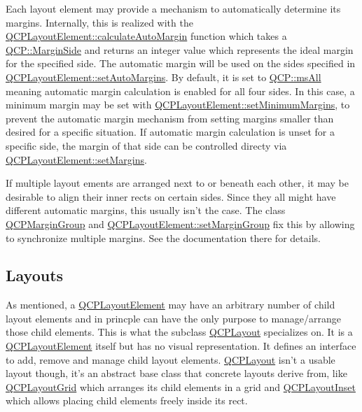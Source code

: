 Each layout element may provide a mechanism to automatically determine its margins. Internally, this is realized with the \hyperlink{class_q_c_p_layout_element_a005c9f0fe84bc1591a2cf2c46fd477b4}{Q\-C\-P\-Layout\-Element\-::calculate\-Auto\-Margin} function which takes a \hyperlink{namespace_q_c_p_a7e487e3e2ccb62ab7771065bab7cae54}{Q\-C\-P\-::\-Margin\-Side} and returns an integer value which represents the ideal margin for the specified side. The automatic margin will be used on the sides specified in \hyperlink{class_q_c_p_layout_element_accfda49994e3e6d51ed14504abf9d27d}{Q\-C\-P\-Layout\-Element\-::set\-Auto\-Margins}. By default, it is set to \hyperlink{namespace_q_c_p_a7e487e3e2ccb62ab7771065bab7cae54a43d7361cb0c5244eabdc962021bffebc}{Q\-C\-P\-::ms\-All} meaning automatic margin calculation is enabled for all four sides. In this case, a minimum margin may be set with \hyperlink{class_q_c_p_layout_element_a0a8a17abc16b7923159fcc7608f94673}{Q\-C\-P\-Layout\-Element\-::set\-Minimum\-Margins}, to prevent the automatic margin mechanism from setting margins smaller than desired for a specific situation. If automatic margin calculation is unset for a specific side, the margin of that side can be controlled directy via \hyperlink{class_q_c_p_layout_element_a8f450b1f3f992ad576fce2c63d8b79cf}{Q\-C\-P\-Layout\-Element\-::set\-Margins}.

If multiple layout ements are arranged next to or beneath each other, it may be desirable to align their inner rects on certain sides. Since they all might have different automatic margins, this usually isn't the case. The class \hyperlink{class_q_c_p_margin_group}{Q\-C\-P\-Margin\-Group} and \hyperlink{class_q_c_p_layout_element_a516e56f76b6bc100e8e71d329866847d}{Q\-C\-P\-Layout\-Element\-::set\-Margin\-Group} fix this by allowing to synchronize multiple margins. See the documentation there for details.\hypertarget{thelayoutsystem_layoutsystem-layout}{}\subsection{Layouts}\label{thelayoutsystem_layoutsystem-layout}
As mentioned, a \hyperlink{class_q_c_p_layout_element}{Q\-C\-P\-Layout\-Element} may have an arbitrary number of child layout elements and in princple can have the only purpose to manage/arrange those child elements. This is what the subclass \hyperlink{class_q_c_p_layout}{Q\-C\-P\-Layout} specializes on. It is a \hyperlink{class_q_c_p_layout_element}{Q\-C\-P\-Layout\-Element} itself but has no visual representation. It defines an interface to add, remove and manage child layout elements. \hyperlink{class_q_c_p_layout}{Q\-C\-P\-Layout} isn't a usable layout though, it's an abstract base class that concrete layouts derive from, like \hyperlink{class_q_c_p_layout_grid}{Q\-C\-P\-Layout\-Grid} which arranges its child elements in a grid and \hyperlink{class_q_c_p_layout_inset}{Q\-C\-P\-Layout\-Inset} which allows placing child elements freely inside its rect.

